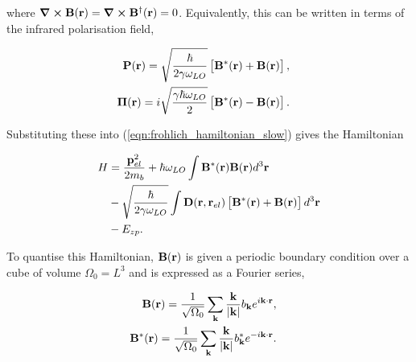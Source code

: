 where $\curl \vb{B}(\vb{r}) = \curl \vb{B}^\dagger(\vb{r}) = 0$. Equivalently, this can be written in terms of the infrared polarisation field,

\begin{subequations}
\begin{align}
    \begin{split}
    \vb{P}(\vb{r}) &= \sqrt{\frac{\hbar}{2\gamma\omega_{LO}}} \left[\vb{B}^*(\vb{r}) + \vb{B}(\vb{r})\right],
    \end{split}\\
    \begin{split}
    \vb{\Pi}(\vb{r}) &= i \sqrt{\frac{\gamma\hbar\omega_{LO}}{2}} \left[\vb{B}^*(\vb{r}) - \vb{B}(\vb{r})\right].
    \end{split}
\end{align}
\end{subequations}

Substituting these into (\ref{eqn:frohlich_hamiltonian_slow}) gives the Hamiltonian

\begin{equation}
\begin{aligned}
    H &= \frac{\vb{p}^2_{el}}{2m_b} + \hbar \omega_{LO} \int \vb{B}^*(\vb{r}) \vb{B}(\vb{r}) d^3\vb{r} \\
    &- \sqrt{\frac{\hbar}{2\gamma\omega_{LO}}} \int \vb{D}(\vb{r}, \vb{r}_{el}) \left[ \vb{B}^*(\vb{r}) + \vb{B}(\vb{r}) \right] d^3 \vb{r} \\
    &- E_{zp}.
\end{aligned}
\end{equation}

To quantise this Hamiltonian, $\vb{B}(\vb{r})$ is given a periodic boundary condition over a cube of volume $\Omega_0 = L^3$ and is expressed as a Fourier series,

\begin{subequations}
\begin{align}
    \begin{split}
        \vb{B}(\vb{r}) &= \frac{1}{\sqrt{\Omega_0}} \sum_{\vb{k}} \frac{\vb{k}}{\abs{\vb{k}}} b_{\vb{k}} e^{i \vb{k} \cdot \vb{r}},
    \end{split}\\
    \begin{split}
        \vb{B}^*(\vb{r}) &= \frac{1}{\sqrt{\Omega_0}} \sum_{\vb{k}} \frac{\vb{k}}{\abs{\vb{k}}} b^*_{\vb{k}} e^{-i \vb{k} \cdot \vb{r}}.
    \end{split}
\end{align}
\end{subequations}

